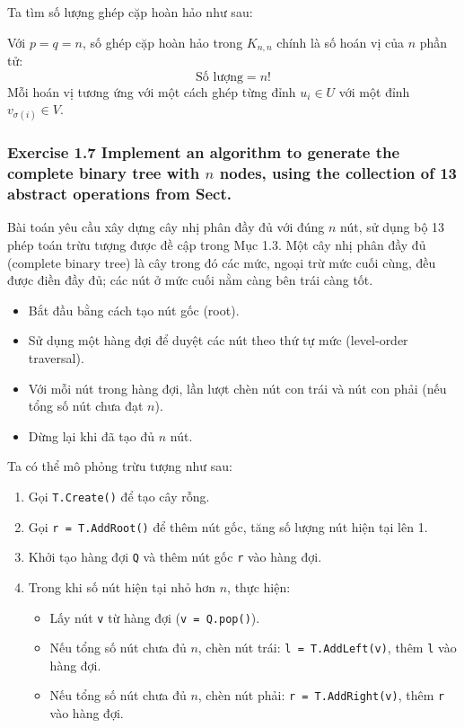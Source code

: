 \documentclass{article}
\begin{document}
	Ta tìm số lượng ghép cặp hoàn hảo như sau:
	
	Với $p = q = n$, số ghép cặp hoàn hảo trong $K_{n,n}$ chính là số hoán vị của $n$ phần tử:
	\[
	\text{Số lượng} = n!
	\]
	Mỗi hoán vị tương ứng với một cách ghép từng đỉnh $u_i \in U$ với một đỉnh $v_{\sigma(i)} \in V$.
	
	\subsubsection*{Exercise 1.7 Implement an algorithm to generate the complete binary tree with $n$ nodes, using the collection of 13 abstract operations from Sect.}
	
	Bài toán yêu cầu xây dựng cây nhị phân đầy đủ với đúng $n$ nút, sử dụng bộ 13 phép toán trừu tượng được đề cập trong Mục 1.3. Một cây nhị phân đầy đủ (complete binary tree) là cây trong đó các mức, ngoại trừ mức cuối cùng, đều được điền đầy đủ; các nút ở mức cuối nằm càng bên trái càng tốt.
	
	\begin{itemize}
		\item Bắt đầu bằng cách tạo nút gốc (root).
		\item Sử dụng một hàng đợi để duyệt các nút theo thứ tự mức (level-order traversal).
		\item Với mỗi nút trong hàng đợi, lần lượt chèn nút con trái và nút con phải (nếu tổng số nút chưa đạt $n$).
		\item Dừng lại khi đã tạo đủ $n$ nút.
	\end{itemize}
	
	Ta có thể mô phỏng trừu tượng như sau:
	
	\begin{enumerate}
		\item Gọi \texttt{T.Create()} để tạo cây rỗng.
		\item Gọi \texttt{r = T.AddRoot()} để thêm nút gốc, tăng số lượng nút hiện tại lên 1.
		\item Khởi tạo hàng đợi \texttt{Q} và thêm nút gốc \texttt{r} vào hàng đợi.
		\item Trong khi số nút hiện tại nhỏ hơn $n$, thực hiện:
		\begin{itemize}
			\item Lấy nút \texttt{v} từ hàng đợi (\texttt{v = Q.pop()}).
			\item Nếu tổng số nút chưa đủ $n$, chèn nút trái: \texttt{l = T.AddLeft(v)}, thêm \texttt{l} vào hàng đợi.
			\item Nếu tổng số nút chưa đủ $n$, chèn nút phải: \texttt{r = T.AddRight(v)}, thêm \texttt{r} vào hàng đợi.
		\end{itemize}
	\end{enumerate}
	
\end{document}
